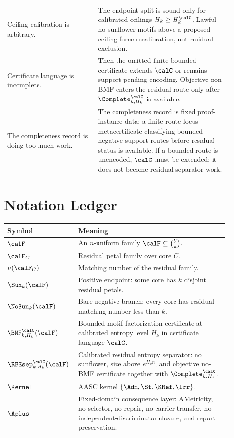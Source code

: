 \documentclass[11pt]{article}
\begin{document}
\begin{center}
\begin{tabular}{p{0.37\linewidth}p{0.55\linewidth}}
Ceiling calibration is arbitrary. & The endpoint split is sound only for calibrated ceilings \(H_k\ge H_k^{\calC}\).  Lawful no-sunflower motifs above a proposed ceiling force recalibration, not residual exclusion. \\
Certificate language is incomplete. & Then the omitted finite bounded certificate extends \(\calC\) or remains support pending encoding.  Objective non-BMF enters the residual route only after \(\Complete^{\calC}_{k,H_k}\) is available. \\
\addlinespace
The completeness record is doing too much work. & The completeness record is fixed proof-instance data: a finite route-locus metacertificate classifying bounded negative-support routes before residual status is available.  If a bounded route is unencoded, \(\calC\) must be extended; it does not become residual separator work. \\
\bottomrule
\end{tabular}
\end{center}

\section{Notation Ledger}

\begin{center}
\begin{tabular}{p{0.25\linewidth}p{0.65\linewidth}}
\toprule
Symbol & Meaning \\
\midrule
\(\calF\) & An \(n\)-uniform family \(\calF\subseteq\binom{U}{n}\). \\
\(\calF_C\) & Residual petal family over core \(C\). \\
\(\nu(\calF_C)\) & Matching number of the residual family. \\
\(\Sun_k(\calF)\) & Positive endpoint: some core has \(k\) disjoint residual petals. \\
\(\NoSun_k(\calF)\) & Bare negative branch: every core has residual matching number less than \(k\). \\
\(\BMF^{\calC}_{k,H_k}(\calF)\) & Bounded motif factorization certificate at calibrated entropy level \(H_k\) in certificate language \(\calC\). \\
\(\RBEsep^{\calC}_{k,H_k}(\calF)\) & Calibrated residual entropy separator: no sunflower, size above \(e^{H_k n}\), and objective no-BMF certificate together with \(\Complete^{\calC}_{k,H_k}\). \\
\(\Kernel\) & AASC kernel \(\{\Adm,\St,\KRef,\Irr\}\). \\
\(\Aplus\) & Fixed-domain consequence layer: AMetricity, no-selector, no-repair, no-carrier-transfer, no-independent-discriminator closure, and report preservation. \\
\bottomrule
\end{tabular}
\end{center}
\end{document}
